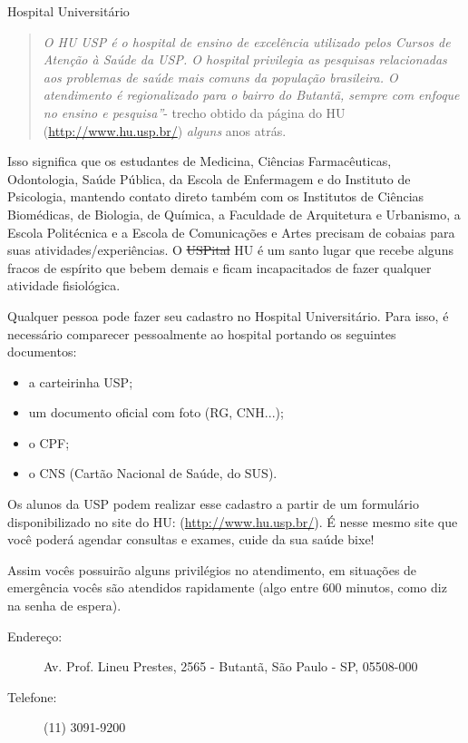\begin{secao}{Hospital Universitário}
   \begin{quote}\emph{O HU USP é o hospital de ensino de excelência utilizado
pelos Cursos de Atenção à Saúde da USP.  O hospital privilegia as pesquisas
relacionadas aos problemas de saúde  mais comuns da população brasileira. O
atendimento é regionalizado para o bairro do Butantã, sempre com enfoque no
ensino e pesquisa''}- trecho obtido da página do HU (\url{http://www.hu.usp.br/})
\textit{alguns} anos atrás.
   \end{quote}

Isso significa que os estudantes de Medicina, Ciências Farmacêuticas,
Odontologia, Saúde Pública, da Escola de Enfermagem e do Instituto de
Psicologia, mantendo contato direto também com os Institutos de Ciências
Biomédicas, de Biologia, de Química, a Faculdade de Arquitetura e Urbanismo,
a Escola Politécnica e a Escola de Comunicações e Artes precisam de cobaias para
suas atividades/experiências. O \sout{USPital} HU é um santo lugar que recebe alguns 
fracos de espírito que bebem demais e ficam incapacitados de fazer qualquer 
atividade fisiológica. 

Qualquer pessoa pode fazer seu cadastro no Hospital Universitário. Para isso, é 
necessário comparecer pessoalmente ao hospital portando os seguintes documentos:

\begin{itemize}
   \item a carteirinha USP;
   \item um documento oficial com foto (RG, CNH...);
   \item o CPF;
   \item o CNS (Cartão Nacional de Saúde, do SUS).
\end{itemize}

Os alunos da USP podem realizar esse cadastro a partir de um formulário 
disponibilizado no site do HU: (\url{http://www.hu.usp.br/}). É nesse mesmo site 
que você poderá agendar consultas e exames, cuide da sua saúde bixe!

Assim vocês possuirão alguns privilégios no atendimento, em situações de
emergência vocês são atendidos rapidamente (algo entre 600 minutos, como
diz na senha de espera). %

\begin{description}
\item [Endereço:] Av. Prof. Lineu Prestes, 2565 - Butantã, São Paulo - SP, 05508-000
\item [Telefone:] (11) 3091-9200
\end{description}

\end{secao}
